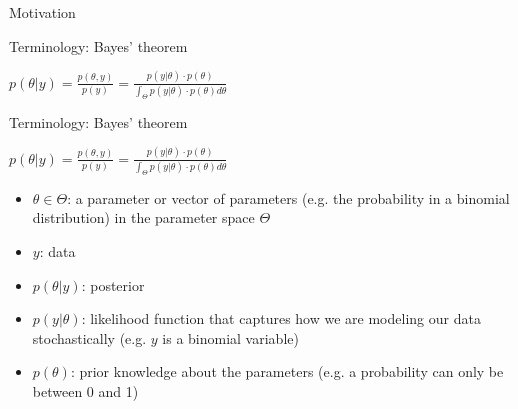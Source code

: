 \begin{frame}{Motivation}


\end{frame}


\begin{frame}{Terminology: Bayes' theorem}
    \begin{center}
        $p(\theta|y) = \displaystyle \frac{p(\theta, y)}{p(y)} = \displaystyle \frac{p(y|\theta) \cdot p(\theta)}{\int_\Theta p(y|\theta) \cdot p(\theta) d\theta}$\\
    \end{center}

\end{frame}

\begin{frame}{Terminology: Bayes' theorem}
    \begin{center}
        $p(\theta|y) = \displaystyle \frac{p(\theta, y)}{p(y)} = \displaystyle \frac{p(y|\theta) \cdot p(\theta)}{\int_\Theta p(y|\theta) \cdot p(\theta) d\theta}$\\
    \end{center}

    \begin{itemize}


        \item
        $\theta \in \Theta$: a parameter or vector of parameters (e.g. the probability in a binomial distribution) in the parameter space $\Theta$

        \item
        $y$: data

        \item
        $p(\theta|y)$: posterior

        \item
        $p(y|\theta)$: likelihood function that captures how we are modeling our data stochastically (e.g. $y$ is a binomial variable)

        \item
        $p(\theta)$: prior knowledge about the parameters (e.g. a probability can only be between 0 and 1)



    \end{itemize}
\end{frame}



